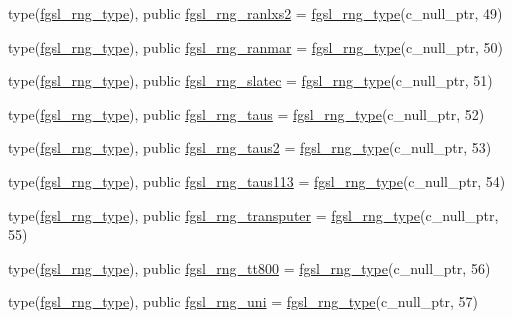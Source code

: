 \begin{DoxyCompactItemize}
\item 
type(\hyperlink{structfgsl_1_1fgsl__rng__type}{fgsl\-\_\-rng\-\_\-type}), public \hyperlink{classfgsl_a961029daf705e420d4626038ceffbdc5}{fgsl\-\_\-rng\-\_\-ranlxs2} = \hyperlink{structfgsl_1_1fgsl__rng__type}{fgsl\-\_\-rng\-\_\-type}(c\-\_\-null\-\_\-ptr, 49)
\item 
type(\hyperlink{structfgsl_1_1fgsl__rng__type}{fgsl\-\_\-rng\-\_\-type}), public \hyperlink{classfgsl_a099ffd8b436045a9bd570027a1406df4}{fgsl\-\_\-rng\-\_\-ranmar} = \hyperlink{structfgsl_1_1fgsl__rng__type}{fgsl\-\_\-rng\-\_\-type}(c\-\_\-null\-\_\-ptr, 50)
\item 
type(\hyperlink{structfgsl_1_1fgsl__rng__type}{fgsl\-\_\-rng\-\_\-type}), public \hyperlink{classfgsl_aa8d0035b0617f463167b9fce7aeedd26}{fgsl\-\_\-rng\-\_\-slatec} = \hyperlink{structfgsl_1_1fgsl__rng__type}{fgsl\-\_\-rng\-\_\-type}(c\-\_\-null\-\_\-ptr, 51)
\item 
type(\hyperlink{structfgsl_1_1fgsl__rng__type}{fgsl\-\_\-rng\-\_\-type}), public \hyperlink{classfgsl_a9fe9a6cae0f833d90b9c22d644165758}{fgsl\-\_\-rng\-\_\-taus} = \hyperlink{structfgsl_1_1fgsl__rng__type}{fgsl\-\_\-rng\-\_\-type}(c\-\_\-null\-\_\-ptr, 52)
\item 
type(\hyperlink{structfgsl_1_1fgsl__rng__type}{fgsl\-\_\-rng\-\_\-type}), public \hyperlink{classfgsl_a49b9837652787069b7179152078a6c9d}{fgsl\-\_\-rng\-\_\-taus2} = \hyperlink{structfgsl_1_1fgsl__rng__type}{fgsl\-\_\-rng\-\_\-type}(c\-\_\-null\-\_\-ptr, 53)
\item 
type(\hyperlink{structfgsl_1_1fgsl__rng__type}{fgsl\-\_\-rng\-\_\-type}), public \hyperlink{classfgsl_a4b4cf5cdf021417e3147d6efff412544}{fgsl\-\_\-rng\-\_\-taus113} = \hyperlink{structfgsl_1_1fgsl__rng__type}{fgsl\-\_\-rng\-\_\-type}(c\-\_\-null\-\_\-ptr, 54)
\item 
type(\hyperlink{structfgsl_1_1fgsl__rng__type}{fgsl\-\_\-rng\-\_\-type}), public \hyperlink{classfgsl_ae6f6fd654d8c94d4ff5cf3a3eb274ccb}{fgsl\-\_\-rng\-\_\-transputer} = \hyperlink{structfgsl_1_1fgsl__rng__type}{fgsl\-\_\-rng\-\_\-type}(c\-\_\-null\-\_\-ptr, 55)
\item 
type(\hyperlink{structfgsl_1_1fgsl__rng__type}{fgsl\-\_\-rng\-\_\-type}), public \hyperlink{classfgsl_a1ec0bdbcac349e419b11ccb34d994e2d}{fgsl\-\_\-rng\-\_\-tt800} = \hyperlink{structfgsl_1_1fgsl__rng__type}{fgsl\-\_\-rng\-\_\-type}(c\-\_\-null\-\_\-ptr, 56)
\item 
type(\hyperlink{structfgsl_1_1fgsl__rng__type}{fgsl\-\_\-rng\-\_\-type}), public \hyperlink{classfgsl_aaa640575921c58278aa5f851482cd072}{fgsl\-\_\-rng\-\_\-uni} = \hyperlink{structfgsl_1_1fgsl__rng__type}{fgsl\-\_\-rng\-\_\-type}(c\-\_\-null\-\_\-ptr, 57)

\end{DoxyCompactItemize}
